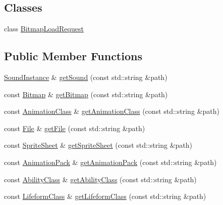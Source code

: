 \subsection*{Classes}
\begin{DoxyCompactItemize}
\item 
class \hyperlink{classZeta_1_1SynchronousResourceContext_1_1BitmapLoadRequest}{Bitmap\+Load\+Request}
\end{DoxyCompactItemize}
\subsection*{Public Member Functions}
\begin{DoxyCompactItemize}
\item 
\hyperlink{classZeta_1_1SoundInstance}{Sound\+Instance} \& \hyperlink{classZeta_1_1SynchronousResourceContext_ae790684b923bc6da219264f8ff18f411}{get\+Sound} (const std\+::string \&path)
\item 
const \hyperlink{classZeta_1_1Bitmap}{Bitmap} \& \hyperlink{classZeta_1_1SynchronousResourceContext_a2e1a647e7fb09d4473db1ababc41f8f8}{get\+Bitmap} (const std\+::string \&path)
\item 
const \hyperlink{classZeta_1_1AnimationClass}{Animation\+Class} \& \hyperlink{classZeta_1_1SynchronousResourceContext_aeb940b34e56d1acb56c3f0fb880faa0d}{get\+Animation\+Class} (const std\+::string \&path)
\item 
const \hyperlink{classZeta_1_1File}{File} \& \hyperlink{classZeta_1_1SynchronousResourceContext_ac2df915fb0b31bcf4c759517e6214253}{get\+File} (const std\+::string \&path)
\item 
const \hyperlink{classZeta_1_1SpriteSheet}{Sprite\+Sheet} \& \hyperlink{classZeta_1_1SynchronousResourceContext_aeb258ef6edd0e9b8e0e85c9511bc8fb1}{get\+Sprite\+Sheet} (const std\+::string \&path)
\item 
const \hyperlink{classZeta_1_1AnimationPack}{Animation\+Pack} \& \hyperlink{classZeta_1_1SynchronousResourceContext_a0e106241deb5872901a6775a467cdbfd}{get\+Animation\+Pack} (const std\+::string \&path)
\item 
const \hyperlink{classZeta_1_1AbilityClass}{Ability\+Class} \& \hyperlink{classZeta_1_1SynchronousResourceContext_ac44ae65984e2797771508fe18ab2ead4}{get\+Ability\+Class} (const std\+::string \&path)
\item 
const \hyperlink{classZeta_1_1LifeformClass}{Lifeform\+Class} \& \hyperlink{classZeta_1_1SynchronousResourceContext_a4616dfa5fe15ddc86b746e62297cc745}{get\+Lifeform\+Class} (const std\+::string \&path)

\end{DoxyCompactItemize}
